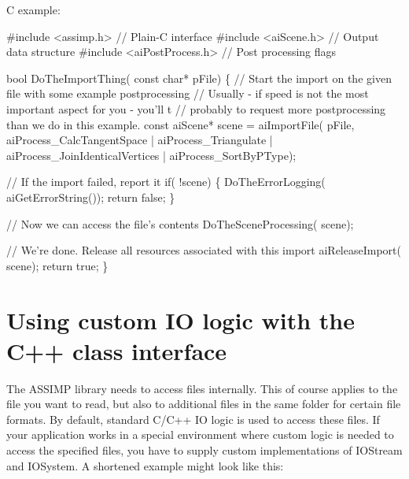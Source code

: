 C example\+: 
\begin{DoxyCode}
\textcolor{preprocessor}{#include <assimp.h>}        \textcolor{comment}{// Plain-C interface}
\textcolor{preprocessor}{#include <aiScene.h>}       \textcolor{comment}{// Output data structure}
\textcolor{preprocessor}{#include <aiPostProcess.h>} \textcolor{comment}{// Post processing flags}

\textcolor{keywordtype}{bool} DoTheImportThing( \textcolor{keyword}{const} \textcolor{keywordtype}{char}* pFile)
\{
  \textcolor{comment}{// Start the import on the given file with some example postprocessing}
  \textcolor{comment}{// Usually - if speed is not the most important aspect for you - you'll t}
  \textcolor{comment}{// probably to request more postprocessing than we do in this example.}
  \textcolor{keyword}{const} aiScene* scene = aiImportFile( pFile, 
    aiProcess\_CalcTangentSpace       | 
    aiProcess\_Triangulate            |
    aiProcess\_JoinIdenticalVertices  |
    aiProcess\_SortByPType);

  \textcolor{comment}{// If the import failed, report it}
  \textcolor{keywordflow}{if}( !scene)
  \{
    DoTheErrorLogging( aiGetErrorString());
    \textcolor{keywordflow}{return} \textcolor{keyword}{false};
  \}

  \textcolor{comment}{// Now we can access the file's contents}
  DoTheSceneProcessing( scene);

  \textcolor{comment}{// We're done. Release all resources associated with this import}
  aiReleaseImport( scene);
  \textcolor{keywordflow}{return} \textcolor{keyword}{true};
\}
\end{DoxyCode}
\hypertarget{usage_custom_io}{}\section{Using custom I\+O logic with the C++ class interface}\label{usage_custom_io}
The A\+S\+S\+I\+M\+P library needs to access files internally. This of course applies to the file you want to read, but also to additional files in the same folder for certain file formats. By default, standard C/\+C++ I\+O logic is used to access these files. If your application works in a special environment where custom logic is needed to access the specified files, you have to supply custom implementations of I\+O\+Stream and I\+O\+System. A shortened example might look like this\+:


